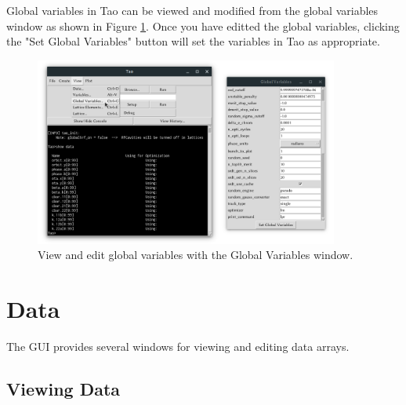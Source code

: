 Global variables in Tao can be viewed and modified from the global variables window as shown in Figure \ref{fig:gui.global.variables}.
Once you have editted the global variables, clicking the "Set Global Variables" button will set the variables in Tao as appropriate.

\begin{figure}
\centering
\includegraphics[width=10cm]{figures/globals.png}
\caption{View and edit global variables with the Global Variables window.}
\label{fig:gui.global.variables}
\end{figure}

\section{Data}
\label{s:gui.data}

The GUI provides several windows for viewing and editing data arrays.

\subsection{Viewing Data}
\label{s:gui.data.view}

